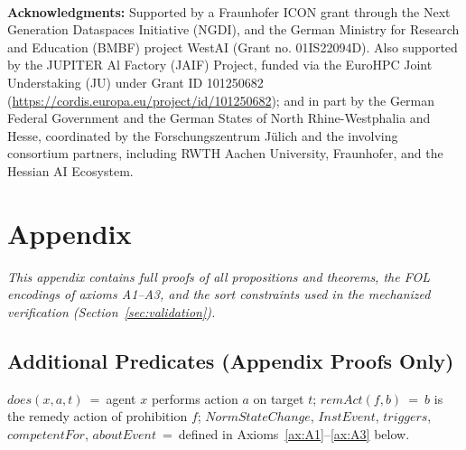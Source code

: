 \documentclass{IOS-Book-Article}
\theoremstyle{definition}
\begin{document}
\noindent
\\
\textbf{Acknowledgments:} Supported by a Fraunhofer ICON grant through the Next Generation Dataspaces Initiative (NGDI), and the German Ministry for Research and Education (BMBF) project WestAI (Grant no. 01IS22094D). Also supported by the JUPITER Al Factory (JAIF) Project, funded via the EuroHPC Joint Understaking (JU) under Grant ID 101250682 (\url{https://cordis.europa.eu/project/id/101250682}); and in part by the German Federal Government and the German States of North Rhine-Westphalia and Hesse, coordinated by the Forschungszentrum Jülich and the involving consortium partners, including RWTH Aachen University, Fraunhofer, and the Hessian AI Ecosystem.

\newpage


\newpage
\appendix
\section{Appendix}
\label{app:proofs}
\noindent\textit{This appendix contains full proofs of all
propositions and theorems, the FOL encodings of axioms
A1--A3, and the sort constraints used in the mechanized
verification (Section~\ref{sec:validation}).}
\subsection*{Additional Predicates (Appendix Proofs Only)}
\label{app:abbrev}
\noindent
$\mathit{does}(x,a,t)$~=~agent $x$ performs action $a$ on target $t$;
$\mathit{remAct}(f,b)$~=~$b$ is the remedy action of prohibition $f$;
$\mathit{NormStateChange}$, $\mathit{InstEvent}$, $\mathit{triggers}$,
$\mathit{competentFor}$, $\mathit{aboutEvent}$~=~defined in
Axioms~\ref{ax:A1}--\ref{ax:A3} below.

\end{document}
